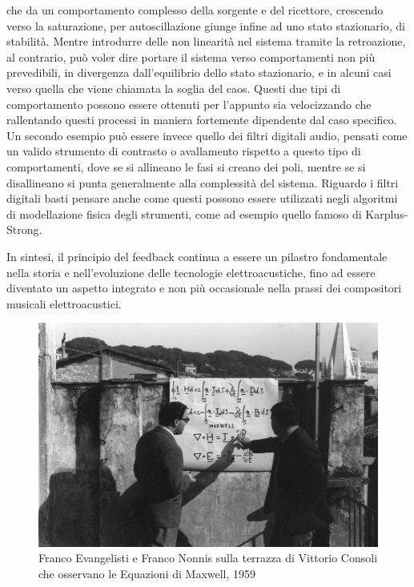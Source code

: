 che da un comportamento complesso della sorgente e del ricettore, crescendo
verso la saturazione, per autoscillazione giunge infine ad uno stato stazionario, di stabilità.
Mentre introdurre delle non linearità nel sistema tramite la retroazione,
al contrario, può voler dire portare il sistema verso comportamenti non più prevedibili,
in divergenza dall'equilibrio dello stato stazionario,
e in alcuni casi verso quella che viene chiamata la soglia del caos.
Questi due tipi di comportamento possono essere ottenuti per l'appunto
sia velocizzando che rallentando questi processi
in maniera fortemente dipendente dal caso specifico.
Un secondo esempio può essere invece quello dei filtri digitali audio,
pensati come un valido strumento
di contrasto o avallamento rispetto a questo tipo di comportamenti,
dove se si allineano le fasi si creano dei poli,
mentre se si disallineano si punta generalmente alla complessità del sistema.
Riguardo i filtri digitali basti pensare anche come questi possono essere utilizzati 
negli algoritmi di modellazione fisica
degli strumenti, come ad esempio quello famoso di Karplus-Strong.

In sintesi, il principio del feedback continua a essere un pilastro fondamentale nella storia 
e nell'evoluzione delle tecnologie elettroacustiche, 
fino ad essere diventato un aspetto integrato e non più occasionale 
nella prassi dei compositori musicali elettroacustici.

\begin{figure}[h!]
    \begin{center}
        \vspace{0.5cm}
        \includegraphics[width=12cm]{figures/EvangelistiNonnis.jpg}
        \caption{Franco Evangelisti e Franco Nonnis sulla terrazza di Vittorio Consoli 
        che osservano le Equazioni di Maxwell, 1959}
        \vspace{0.5cm}
        \end{center}
\end{figure} 
